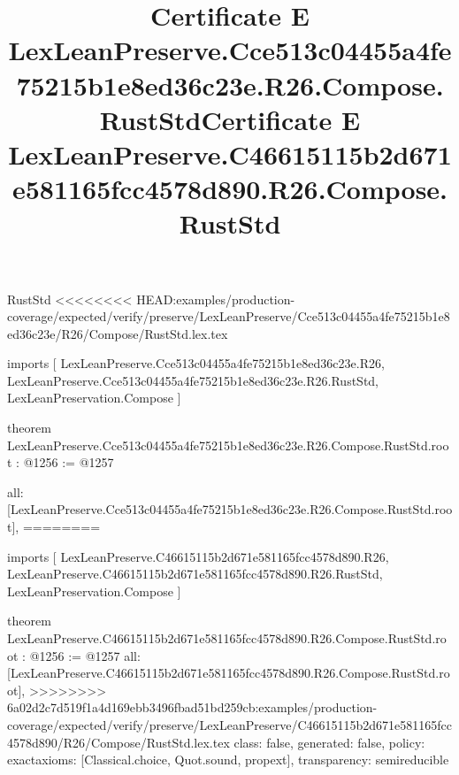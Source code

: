 \begin{lexlean}{RustStd}
<<<<<<<< HEAD:examples/production-coverage/expected/verify/preserve/LexLeanPreserve/Cce513c04455a4fe75215b1e8ed36c23e/R26/Compose/RustStd.lex.tex
\title{Certificate E LexLeanPreserve.Cce513c04455a4fe75215b1e8ed36c23e.R26.Compose.RustStd}
\begin{coremodule}
imports [
  LexLeanPreserve.Cce513c04455a4fe75215b1e8ed36c23e.R26,
  LexLeanPreserve.Cce513c04455a4fe75215b1e8ed36c23e.R26.RustStd,
  LexLeanPreservation.Compose
]

theorem LexLeanPreserve.Cce513c04455a4fe75215b1e8ed36c23e.R26.Compose.RustStd.root : @1256 := @1257 {
  all: [LexLeanPreserve.Cce513c04455a4fe75215b1e8ed36c23e.R26.Compose.RustStd.root],
========
\title{Certificate E LexLeanPreserve.C46615115b2d671e581165fcc4578d890.R26.Compose.RustStd}
\begin{coremodule}
imports [
  LexLeanPreserve.C46615115b2d671e581165fcc4578d890.R26,
  LexLeanPreserve.C46615115b2d671e581165fcc4578d890.R26.RustStd,
  LexLeanPreservation.Compose
]

theorem LexLeanPreserve.C46615115b2d671e581165fcc4578d890.R26.Compose.RustStd.root : @1256 := @1257 {
  all: [LexLeanPreserve.C46615115b2d671e581165fcc4578d890.R26.Compose.RustStd.root],
>>>>>>>> 6a02d2c7d519f1a4d169ebb3496fbad51bd259cb:examples/production-coverage/expected/verify/preserve/LexLeanPreserve/C46615115b2d671e581165fcc4578d890/R26/Compose/RustStd.lex.tex
  class: false,
  generated: false,
  policy: exact{axioms: [Classical.choice, Quot.sound, propext]},
  transparency: semireducible
}


\end{coremodule}}
\end{coremodule}
\end{lexlean}
